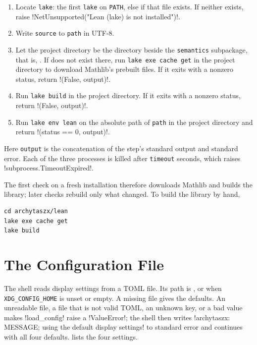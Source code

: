 \begin{algorithm}\label{alg:install-check}
\leavevmode
\begin{enumerate}
\item Locate \texttt{lake}: the first \texttt{lake} on \texttt{PATH}, else  if that file exists. If neither exists, raise \py!NetUnsupported("Lean (lake) is not installed")!.
\item Write \texttt{source} to \texttt{path} in UTF-8.
\item Let the project directory be the directory  beside the \texttt{semantics} subpackage, that is, . If  does not exist there, run \texttt{lake exe cache get} in the project directory to download Mathlib's prebuilt files. If it exits with a nonzero status, return \py!(False, output)!.
\item Run \texttt{lake build} in the project directory. If it exits with a nonzero status, return \py!(False, output)!.
\item Run \texttt{lake env lean} on the absolute path of \texttt{path} in the project directory and return \py!(status == 0, output)!.
\end{enumerate}
Here \texttt{output} is the concatenation of the step's standard output and standard error. Each of the three processes is killed after \texttt{timeout} seconds, which raises \py!subprocess.TimeoutExpired!.
\end{algorithm}

The first check on a fresh installation therefore downloads Mathlib and builds the library; later checks rebuild only what changed. To build the library by hand,
\begin{lstlisting}[style=shell]
cd archytaszx/lean
lake exe cache get
lake build
\end{lstlisting}

\section{The Configuration File}\label{sec:install-config}

The shell reads display settings from a TOML file. Its path is , or  when \texttt{XDG\_CONFIG\_HOME} is unset or empty. A missing file gives the defaults. An unreadable file, a file that is not valid TOML, an unknown key, or a bad value makes \py!load_config! raise a \py!ValueError!; the shell then writes \code!archytaszx: MESSAGE; using the default display settings! to standard error and continues with all four defaults.  lists the four settings.

